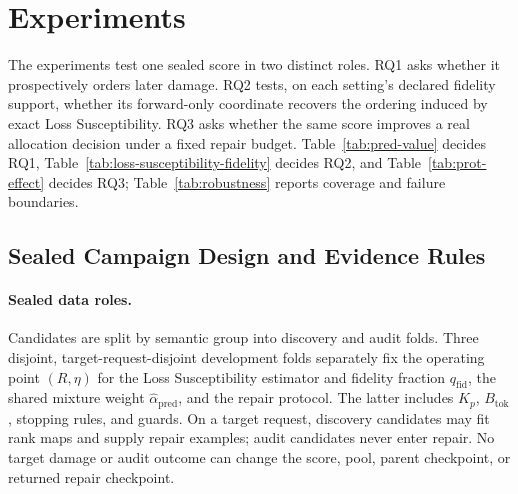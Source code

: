 \section{Experiments}
\label{sec:experiments}

The experiments test one sealed score in two distinct roles. RQ1 asks whether
it prospectively orders later damage. RQ2 tests, on each setting's declared
fidelity support, whether its forward-only coordinate recovers the ordering
induced by exact Loss Susceptibility. RQ3 asks whether
the same score improves a real allocation decision under a fixed repair
budget. Table~\ref{tab:pred-value} decides RQ1,
Table~\ref{tab:loss-susceptibility-fidelity} decides RQ2, and
Table~\ref{tab:prot-effect} decides RQ3;
Table~\ref{tab:robustness} reports coverage and failure boundaries.



\subsection{Sealed Campaign Design and Evidence Rules}
\label{sec:benchmark-protocol}

\paragraph{Sealed data roles.}
Candidates are split by semantic group into discovery and audit folds.
Three disjoint, target-request-disjoint development folds separately fix the
operating point $(R,\eta)$ for the Loss Susceptibility estimator
and fidelity fraction $q_{\mathrm{fid}}$, the shared mixture weight
$\widehat\alpha_{\mathrm{pred}}$, and the repair protocol. The latter includes
$K_p$, $B_{\mathrm{tok}}$, stopping rules, and guards. On a target
request, discovery candidates may fit rank maps and supply repair examples;
audit candidates never enter repair. No target damage or audit outcome can
change the score, pool, parent checkpoint, or returned repair checkpoint.

